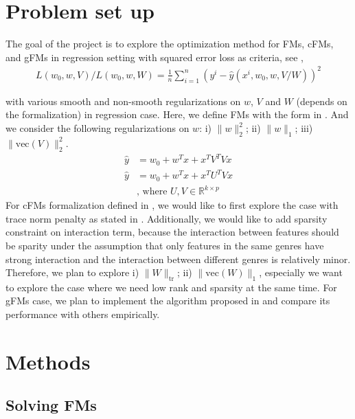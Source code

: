 \documentclass{article}
\newcommand{\tr}{\text{tr}}
\newcommand{\vecc}{\text{vec}}
\begin{document}
\section{Problem set up}


The goal of the project is to explore the optimization method for FMs, cFMs, and gFMs in regression setting with squared error loss as criteria, see ,
\begin{align}
  L(w_0, w, V)/L(w_0, w, W) = \frac{1}{n}\sum_{i = 1}^n (y^i - \hat{y}(x^i, w_0, w, V/W))^2 \label{eq:criteria}
\end{align}

with various smooth and non-smooth regularizations on $w$, $V$ and $W$ (depends on the formalization) in regression case. Here, we define FMs with the form in . And we consider the following regularizations on $w$: i) $\|w\|_2^2$; ii) $\|w\|_1$; iii) $\|\vecc(V)\|_2^2$. 
\begin{align}
  \hat{y} &= w_0 + w^T x + x^T V^TV x \label{eq:fm} \\
  \hat{y} &= w_0 + w^T x + x^T U^TV x \label{eq:gfm} \\
& \text{, where $U, V \in \mathbb{R}^{k \times p}$} \nonumber
\end{align}
For cFMs formalization defined in , we would like to first explore the case with trace norm penalty as stated in \cite{convexFM_paper}. Additionally, we would like to add sparsity constraint on interaction term, because the interaction between features should be sparity under the assumption that only features in the same genres have strong interaction and the interaction between different genres is relatively minor. Therefore, we plan to explore i) $\|W\|_{\tr}$; ii) $\|\vecc(W)\|_1$, especially we want to explore the case where we need low rank and sparsity at the same time. For gFMs case, we plan to implement the algorithm proposed in \cite{generalizedFM_paper} and compare its performance with others empirically.


\section{Methods}


\subsection{Solving FMs}
\end{document}
